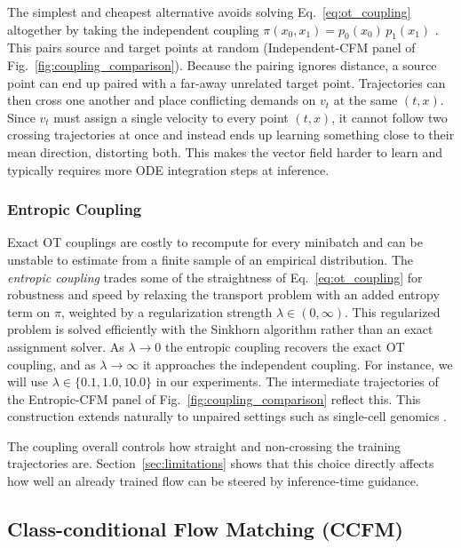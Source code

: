 \documentclass{article}
\begin{document}
The simplest and cheapest alternative avoids solving Eq.~\eqref{eq:ot_coupling} altogether by taking the independent coupling $\pi(x_0,x_1) = p_0(x_0)\,p_1(x_1)$ \citep{tong2024improving}.
This pairs source and target points at random (Independent-CFM panel of Fig.~\ref{fig:coupling_comparison}).
Because the pairing ignores distance, a source point can end up paired with a far-away unrelated target point.
Trajectories can then cross one another and place conflicting demands on $v_t$ at the same $(t,x)$.
Since $v_t$ must assign a single velocity to every point $(t,x)$, it cannot follow two crossing trajectories at once and instead ends up learning something close to their mean direction, distorting both.
This makes the vector field harder to learn and typically requires more ODE integration steps at inference.

\subsubsection{Entropic Coupling}

Exact OT couplings are costly to recompute for every minibatch and can be unstable to estimate from a finite sample of an empirical distribution.
The \emph{entropic coupling} trades some of the straightness of Eq.~\eqref{eq:ot_coupling} for robustness and speed by relaxing the transport problem with an added entropy term on $\pi$, weighted by a regularization strength $\lambda \in (0, \infty)$.
This regularized problem is solved efficiently with the Sinkhorn algorithm rather than an exact assignment solver.
As $\lambda \to 0$ the entropic coupling recovers the exact OT coupling, and as $\lambda \to \infty$ it approaches the independent coupling.
For instance, we will use $\lambda \in \{0.1, 1.0, 10.0\}$ in our experiments.
The intermediate trajectories of the Entropic-CFM panel of Fig.~\ref{fig:coupling_comparison} reflect this.
This construction extends naturally to unpaired settings such as single-cell genomics \citep{klein2024genot}.

The coupling overall controls how straight and non-crossing the training trajectories are.
Section~\ref{sec:limitations} shows that this choice directly affects how well an already trained flow can be steered by inference-time guidance.

\subsection{Class-conditional Flow Matching (CCFM)}
\label{sec:ccfm}
\end{document}
